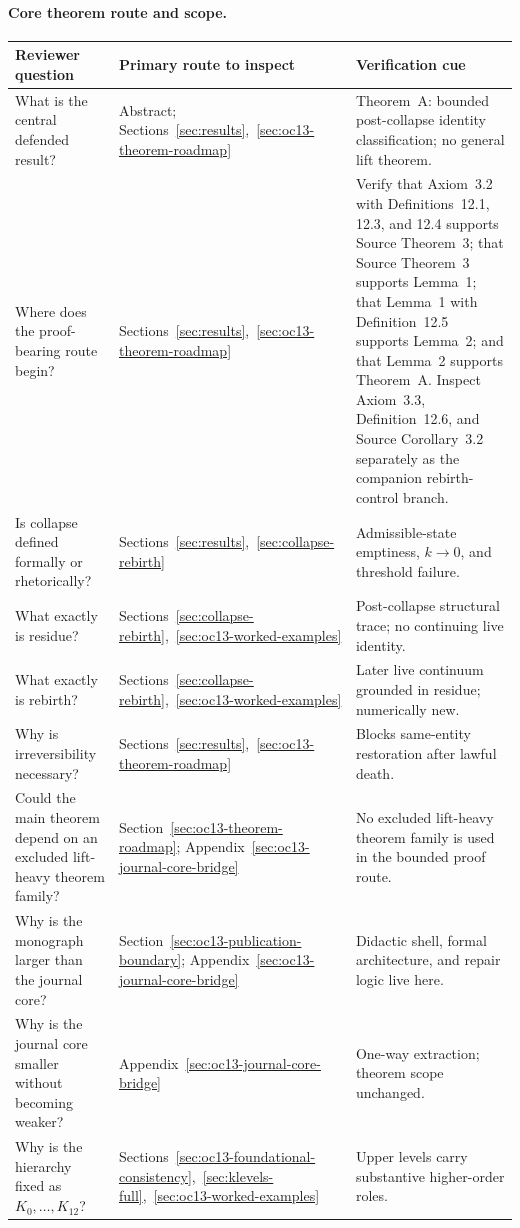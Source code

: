 \paragraph{Core theorem route and scope.}
\par{\centering
\begin{tabular}{@{}L{0.18\textwidth}L{0.26\textwidth}L{0.46\textwidth}@{}}
\toprule
\textbf{Reviewer question} & \textbf{Primary route to inspect} & \textbf{Verification cue} \\
\midrule
What is the central defended result? & Abstract; Sections~\ref{sec:results},~\ref{sec:oc13-theorem-roadmap} & Theorem~A: bounded post-collapse identity classification; no general lift theorem. \\
Where does the proof-bearing route begin? & Sections~\ref{sec:results},~\ref{sec:oc13-theorem-roadmap} & Verify that Axiom~3.2 with Definitions~12.1, 12.3, and 12.4 supports Source Theorem~3; that Source Theorem~3 supports Lemma~1; that Lemma~1 with Definition~12.5 supports Lemma~2; and that Lemma~2 supports Theorem~A. Inspect Axiom~3.3, Definition~12.6, and Source Corollary~3.2 separately as the companion rebirth-control branch. \\
Is collapse defined formally or rhetorically? & Sections~\ref{sec:results},~\ref{sec:collapse-rebirth} & Admissible-state emptiness, \(k\to0\), and threshold failure. \\
What exactly is residue? & Sections~\ref{sec:collapse-rebirth},~\ref{sec:oc13-worked-examples} & Post-collapse structural trace; no continuing live identity. \\
What exactly is rebirth? & Sections~\ref{sec:collapse-rebirth},~\ref{sec:oc13-worked-examples} & Later live continuum grounded in residue; numerically new. \\
Why is irreversibility necessary? & Sections~\ref{sec:results},~\ref{sec:oc13-theorem-roadmap} & Blocks same-entity restoration after lawful death. \\
Could the main theorem depend on an excluded lift-heavy theorem family? & Section~\ref{sec:oc13-theorem-roadmap}; Appendix~\ref{sec:oc13-journal-core-bridge} & No excluded lift-heavy theorem family is used in the bounded proof route. \\
Why is the monograph larger than the journal core? & Section~\ref{sec:oc13-publication-boundary}; Appendix~\ref{sec:oc13-journal-core-bridge} & Didactic shell, formal architecture, and repair logic live here. \\
Why is the journal core smaller without becoming weaker? & Appendix~\ref{sec:oc13-journal-core-bridge} & One-way extraction; theorem scope unchanged. \\
Why is the hierarchy fixed as \(K_0,\dots,K_{12}\)? & Sections~\ref{sec:oc13-foundational-consistency},~\ref{sec:klevels-full},~\ref{sec:oc13-worked-examples} & Upper levels carry substantive higher-order roles. \\
\bottomrule
\end{tabular}
\par}


